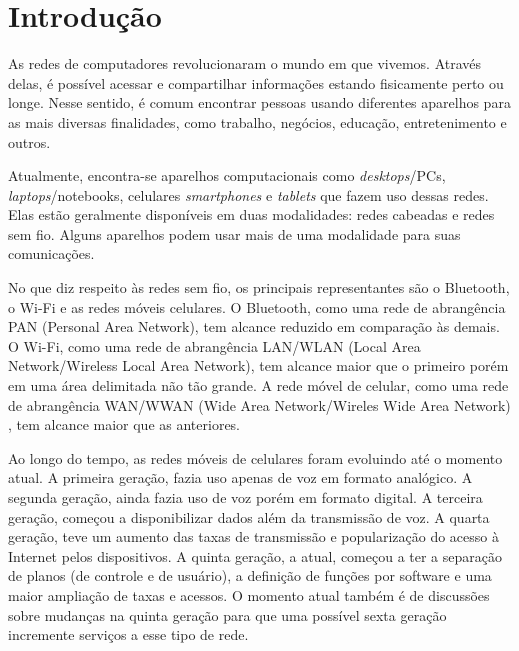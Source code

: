 \documentclass[11pt,oneside,a4paper]{abntex2}
\begin{document}


\maketitle

\section*{Introdução}
\label{intro}

As redes de computadores revolucionaram o mundo em que vivemos. Através delas, é possível acessar e compartilhar informações estando fisicamente perto ou longe. Nesse sentido, é comum encontrar pessoas usando diferentes aparelhos para as mais diversas finalidades, como trabalho, negócios, educação, entretenimento e outros.

Atualmente, encontra-se aparelhos computacionais como \textit{desktops}/PCs, \textit{laptops}/notebooks, celulares \textit{smartphones} e \textit{tablets} que fazem uso dessas redes. Elas estão geralmente disponíveis em duas modalidades: redes cabeadas e redes sem fio. Alguns aparelhos podem usar mais de uma modalidade para suas comunicações.

No que diz respeito às redes sem fio, os principais representantes são o Bluetooth, o Wi-Fi e as redes móveis celulares. O Bluetooth, como uma rede de abrangência PAN (Personal Area Network), tem alcance reduzido em comparação às demais. O Wi-Fi, como uma rede de abrangência LAN/WLAN (Local Area Network/Wireless Local Area Network), tem alcance maior que o primeiro porém em uma área delimitada não tão grande. A rede móvel de celular, como uma rede de abrangência WAN/WWAN (Wide Area Network/Wireles Wide Area Network) \cite{wwan}, tem alcance maior que as anteriores.

Ao longo do tempo, as redes móveis de celulares foram evoluindo até o momento atual. A primeira geração, fazia uso apenas de voz em formato analógico. A segunda geração, ainda fazia uso de voz porém em formato digital. A terceira geração, começou a disponibilizar dados além da transmissão de voz. A quarta geração, teve um aumento das taxas de transmissão e popularização do acesso à Internet pelos dispositivos. A quinta geração, a atual, começou a ter a separação de planos (de controle e de usuário), a definição de funções por software e uma maior ampliação de taxas e acessos. O momento atual também é de discussões sobre mudanças na quinta geração para que uma possível sexta geração incremente serviços a esse tipo de rede.
\end{document}
